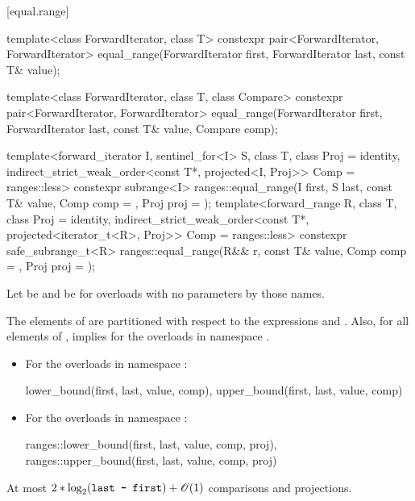[equal.range]{}

%
\begin{itemdecl}
template<class ForwardIterator, class T>
  constexpr pair<ForwardIterator, ForwardIterator>
    equal_range(ForwardIterator first,
                ForwardIterator last, const T& value);

template<class ForwardIterator, class T, class Compare>
  constexpr pair<ForwardIterator, ForwardIterator>
    equal_range(ForwardIterator first,
                ForwardIterator last, const T& value,
                Compare comp);

template<forward_iterator I, sentinel_for<I> S, class T, class Proj = identity,
         indirect_strict_weak_order<const T*, projected<I, Proj>> Comp = ranges::less>
  constexpr subrange<I>
    ranges::equal_range(I first, S last, const T& value, Comp comp = {}, Proj proj = {});
template<forward_range R, class T, class Proj = identity,
         indirect_strict_weak_order<const T*, projected<iterator_t<R>, Proj>> Comp =
           ranges::less>
  constexpr safe_subrange_t<R>
    ranges::equal_range(R&& r, const T& value, Comp comp = {}, Proj proj = {});
\end{itemdecl}

\begin{itemdescr}
\pnum
Let  be  and
 be 
for overloads with no parameters by those names.

\pnum
\expects
The elements  of 
are partitioned with respect to the expressions
 and
.
Also, for all elements  of \tcode{[first, last)},
 implies 
for the overloads in namespace .

\pnum
\returns
\begin{itemize}
\item
For the overloads in namespace :
\begin{codeblock}
{lower_bound(first, last, value, comp),
 upper_bound(first, last, value, comp)}
\end{codeblock}
\item
For the overloads in namespace :
\begin{codeblock}
{ranges::lower_bound(first, last, value, comp, proj),
 ranges::upper_bound(first, last, value, comp, proj)}
\end{codeblock}
\end{itemize}

\pnum
\complexity
At most
$2 * \log_2(\texttt{last - first}) + \mathscr{O}(1)$ comparisons and projections.
\end{itemdescr}

